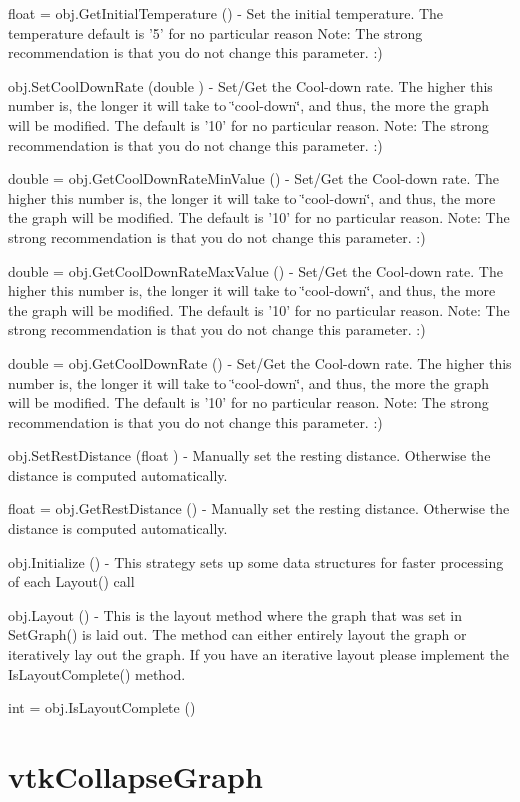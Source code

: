 \begin{DoxyItemize}
\item {\ttfamily float = obj.\-Get\-Initial\-Temperature ()} -\/ Set the initial temperature. The temperature default is '5' for no particular reason Note\-: The strong recommendation is that you do not change this parameter. \-:)  
\item {\ttfamily obj.\-Set\-Cool\-Down\-Rate (double )} -\/ Set/\-Get the Cool-\/down rate. The higher this number is, the longer it will take to \char`\"{}cool-\/down\char`\"{}, and thus, the more the graph will be modified. The default is '10' for no particular reason. Note\-: The strong recommendation is that you do not change this parameter. \-:)  
\item {\ttfamily double = obj.\-Get\-Cool\-Down\-Rate\-Min\-Value ()} -\/ Set/\-Get the Cool-\/down rate. The higher this number is, the longer it will take to \char`\"{}cool-\/down\char`\"{}, and thus, the more the graph will be modified. The default is '10' for no particular reason. Note\-: The strong recommendation is that you do not change this parameter. \-:)  
\item {\ttfamily double = obj.\-Get\-Cool\-Down\-Rate\-Max\-Value ()} -\/ Set/\-Get the Cool-\/down rate. The higher this number is, the longer it will take to \char`\"{}cool-\/down\char`\"{}, and thus, the more the graph will be modified. The default is '10' for no particular reason. Note\-: The strong recommendation is that you do not change this parameter. \-:)  
\item {\ttfamily double = obj.\-Get\-Cool\-Down\-Rate ()} -\/ Set/\-Get the Cool-\/down rate. The higher this number is, the longer it will take to \char`\"{}cool-\/down\char`\"{}, and thus, the more the graph will be modified. The default is '10' for no particular reason. Note\-: The strong recommendation is that you do not change this parameter. \-:)  
\item {\ttfamily obj.\-Set\-Rest\-Distance (float )} -\/ Manually set the resting distance. Otherwise the distance is computed automatically.  
\item {\ttfamily float = obj.\-Get\-Rest\-Distance ()} -\/ Manually set the resting distance. Otherwise the distance is computed automatically.  
\item {\ttfamily obj.\-Initialize ()} -\/ This strategy sets up some data structures for faster processing of each Layout() call  
\item {\ttfamily obj.\-Layout ()} -\/ This is the layout method where the graph that was set in Set\-Graph() is laid out. The method can either entirely layout the graph or iteratively lay out the graph. If you have an iterative layout please implement the Is\-Layout\-Complete() method.  
\item {\ttfamily int = obj.\-Is\-Layout\-Complete ()}  
\end{DoxyItemize}\hypertarget{vtkinfovis_vtkcollapsegraph}{}\section{vtk\-Collapse\-Graph}\label{vtkinfovis_vtkcollapsegraph}
